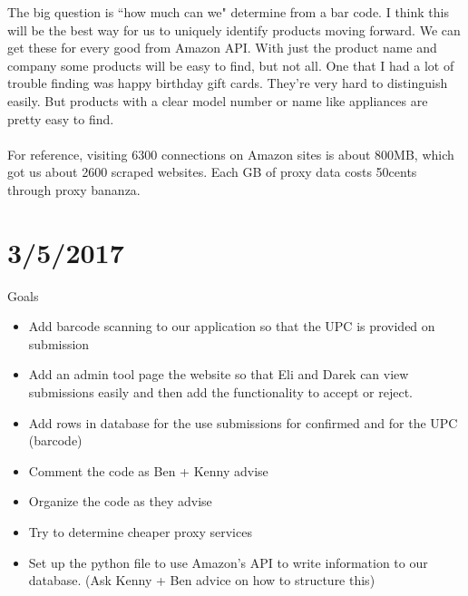 \documentclass[12pt]{article}
\begin{document}
The big question is ``how much can we" determine from a bar code. I think this will be the best way for us to uniquely identify products moving forward. We can get these for every good from Amazon API. With just the product name and company some products will be easy to find, but not all. One that I had a lot of trouble finding was happy birthday gift cards. They're very hard to distinguish easily. But products with a clear model number or name like appliances are pretty easy to find.  \\ \\

For reference, visiting 6300 connections on Amazon sites is about 800MB, which got us about 2600 scraped websites. Each GB of proxy data costs 50cents through proxy bananza.

\section*{3/5/2017}
Goals

\begin{itemize}
	\item Add barcode scanning to our application so that the UPC is provided on submission
	\item Add an admin tool page the website so that Eli and Darek can view submissions easily and then add the functionality to accept or reject.
	\item Add rows in database for the use submissions for confirmed and for the UPC (barcode)
	\item Comment the code as Ben + Kenny advise
	\item Organize the code as they advise
	\item Try to determine cheaper proxy services
	\item Set up the python file to use Amazon's API to write information to our database. (Ask Kenny + Ben advice on how to structure this)
\end{itemize}
\end{document}
